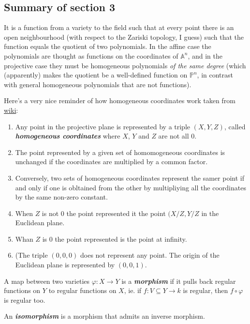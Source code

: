\subsection{Summary of section 3}

\begin{defn}
	It is a function from a variety to the field such that at every point there is an open neighbourhood (with respect to the Zariski topology, I guess) such that the function equals the quotient of two polynomials. In the affine case the polynomials are thought as functions on the coordinates of $\mathbb{A}^n$, and in the projective case they must be homogeneous polynomials \textit{of the same degree} (which (apparently) makes the quotient be a well-defined function on $\mathbb{P}^n$, in contrast with general homogeneous polynomials that are not functions).
\end{defn}

Here's a very nice reminder of how homogeneous coordinates work taken from \href{https://en.wikipedia.org/wiki/Homogeneous_coordinates#Introduction}{wiki}:

\begin{enumerate}
\item Any point in the projective plane is represented by a triple $(X,Y,Z)$,  called \textit{\textbf{homogeneous coordinates}} where $X$, $Y$ and $Z$ are not all 0.
	\item The point represented by a given set of homomogeneous coordinates is unchanged if the coordinates are multiplied by a common factor.
		\item Conversely, two sets of homogeneous coordinates represent the samer point if and only if one is obltained from the other by multipliying all the coordinates by the same non-zero constant.
			\item When $Z$ is not 0 the point represented it the point $(X/Z,Y/Z$ in the Euclidean plane.
				\item Whan $Z$ is 0 the point represented is the point at infinity.
					\item (The triple  $(0,0,0)$ does not represent any point. The origin of the Euclidean plane is represented by $(0,0,1)$.
\end{enumerate}

\begin{defn}[Morphism]
	A map between two varieties $\varphi:X\to Y$ is a \textit{\textbf{morphism}} if it pulls back regular functions on $Y$ to regular functions on $X$, ie. if $f:V\subseteq Y\to k$ is regular, then $f\circ \varphi$ is regular too.

	An \textit{\textbf{isomorphism}} is a morphism that admits an inverse morphism.
\end{defn}

